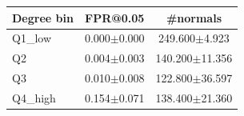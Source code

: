 \begin{tabular}{lcc}
\toprule
Degree bin & FPR@0.05 & \#normals \\
\midrule
Q1\_low & 0.000$\pm$0.000 & 249.600$\pm$4.923 \\
Q2 & 0.004$\pm$0.003 & 140.200$\pm$11.356 \\
Q3 & 0.010$\pm$0.008 & 122.800$\pm$36.597 \\
Q4\_high & 0.154$\pm$0.071 & 138.400$\pm$21.360 \\
\bottomrule
\end{tabular}

